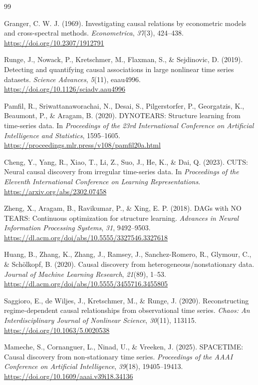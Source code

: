 \begin{thebibliography}{99}

 Granger, C. W. J. (1969). Investigating causal relations by econometric models and cross-spectral methods. \textit{Econometrica}, \textit{37}(3), 424--438. \url{https://doi.org/10.2307/1912791}

 Runge, J., Nowack, P., Kretschmer, M., Flaxman, S., \& Sejdinovic, D. (2019). Detecting and quantifying causal associations in large nonlinear time series datasets. \textit{Science Advances}, \textit{5}(11), eaau4996. \url{https://doi.org/10.1126/sciadv.aau4996}

 Pamfil, R., Sriwattanaworachai, N., Desai, S., Pilgerstorfer, P., Georgatzis, K., Beaumont, P., \& Aragam, B. (2020). DYNOTEARS: Structure learning from time-series data. In \textit{Proceedings of the 23rd International Conference on Artificial Intelligence and Statistics}, 1595--1605. \url{https://proceedings.mlr.press/v108/pamfil20a.html}

 Cheng, Y., Yang, R., Xiao, T., Li, Z., Suo, J., He, K., \& Dai, Q. (2023). CUTS: Neural causal discovery from irregular time-series data. In \textit{Proceedings of the Eleventh International Conference on Learning Representations}. \url{https://arxiv.org/abs/2302.07458}

 Zheng, X., Aragam, B., Ravikumar, P., \& Xing, E. P. (2018). DAGs with NO TEARS: Continuous optimization for structure learning. \textit{Advances in Neural Information Processing Systems}, \textit{31}, 9492--9503. \url{https://dl.acm.org/doi/abs/10.5555/3327546.3327618}

 Huang, B., Zhang, K., Zhang, J., Ramsey, J., Sanchez-Romero, R., Glymour, C., \& Sch{\"o}lkopf, B. (2020). Causal discovery from heterogeneous/nonstationary data. \textit{Journal of Machine Learning Research}, \textit{21}(89), 1--53. \url{https://dl.acm.org/doi/abs/10.5555/3455716.3455805}

 Saggioro, E., de Wiljes, J., Kretschmer, M., \& Runge, J. (2020). Reconstructing regime-dependent causal relationships from observational time series. \textit{Chaos: An Interdisciplinary Journal of Nonlinear Science}, \textit{30}(11), 113115. \url{https://doi.org/10.1063/5.0020538}

 Mameche, S., Cornanguer, L., Ninad, U., \& Vreeken, J. (2025). SPACETIME: Causal discovery from non-stationary time series. \textit{Proceedings of the AAAI Conference on Artificial Intelligence}, \textit{39}(18), 19405--19413. \url{https://doi.org/10.1609/aaai.v39i18.34136}


\end{thebibliography}
